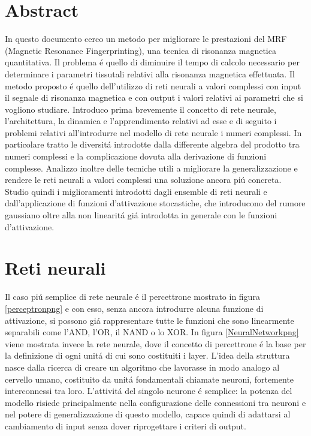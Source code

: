 \documentclass[a4paper,10pt]{article}
\date{12/08/2019}
\begin{document}
 
 \section{Abstract}
 
 In questo documento cerco un metodo per migliorare le prestazioni del MRF (Magnetic Resonance Fingerprinting), una tecnica di risonanza magnetica quantitativa. Il problema \'e quello di diminuire il tempo di calcolo necessario per determinare i parametri tissutali relativi alla risonanza magnetica effettuata. Il metodo proposto \'e quello dell'utilizzo di reti neurali a valori complessi con input il segnale di risonanza magnetica e con output i valori relativi ai parametri che si vogliono studiare. 
 Introduco prima brevemente il concetto di rete neurale, l'architettura, la dinamica e l'apprendimento relativi ad esse e di seguito i problemi relativi all'introdurre nel modello di rete neurale  i numeri complessi. In particolare tratto le diversit\'a introdotte dalla differente algebra del prodotto tra numeri complessi e la complicazione dovuta alla derivazione di funzioni complesse.
 Analizzo inoltre delle tecniche utili a migliorare la generalizzazione e rendere le reti neurali a valori complessi una soluzione ancora pi\'u concreta. Studio quindi i miglioramenti introdotti dagli ensemble di reti neurali e dall'applicazione di funzioni d'attivazione stocastiche, che introducono del rumore gaussiano oltre alla non linearit\'a gi\'a introdotta in generale con le funzioni d'attivazione.
 
 
 \section{Reti neurali}  
 Il caso pi\'u semplice di rete neurale \'e il percettrone mostrato in figura \ref{perceptronpng} e con esso, senza ancora introdurre alcuna funzione di attivazione, si possono gi\'a rappresentare tutte le funzioni che sono linearmente separabili come l'AND, l'OR, il NAND o lo XOR. In figura \ref{NeuralNetworkpng} viene mostrata invece la rete neurale, dove il concetto di percettrone \'e la base per la definizione di ogni unit\'a di cui sono costituiti i layer. L'idea della struttura nasce dalla ricerca di creare un algoritmo che lavorasse in modo analogo al cervello umano, costituito da unit\'a fondamentali chiamate neuroni, fortemente interconnessi tra loro. L'attivit\'a del singolo neurone \'e semplice: la potenza del modello risiede principalmente nella configurazione delle connessioni tra neuroni e nel potere di generalizzazione di questo modello, capace quindi di adattarsi al cambiamento di input senza dover riprogettare i criteri di output.
 
\end{document}
